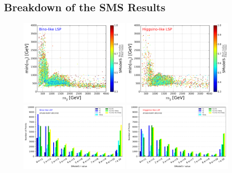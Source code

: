 \documentclass[epj,nopacs,fleqn]{svjour}
\begin{document}
\subsection{Breakdown of the SMS Results}
\begin{figure}[!]
	\begin{center}
		\subfigure
		{\includegraphics[width=0.49\textwidth]{PLOTS/Weights/BINO_rValus_Glu_Sq_Ratio.png}}
		\subfigure
		{\includegraphics[width=0.49\textwidth]{PLOTS/Weights/HIGGSINO_rValus_Glu_Sq_Ratio.png}}
		\subfigure
		{\includegraphics[width=0.49\textwidth]{PLOTS/Combination/ATLAS-SUSY-2013-02_Bino_rValuesHisto.pdf}}
		\subfigure
		{\includegraphics[width=0.49\textwidth]{PLOTS/Combination/ATLAS-SUSY-2013-02_Higgsino_rValuesHisto.pdf}}

\end{center}
\end{figure}
\end{document}
